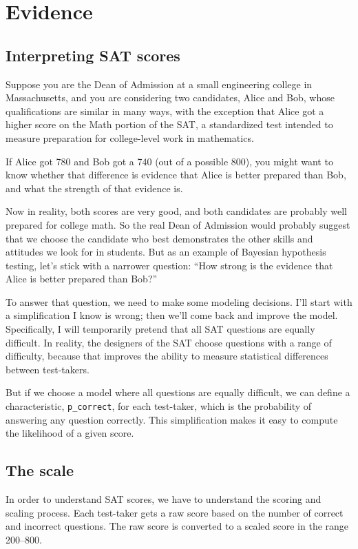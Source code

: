 \documentclass[12pt]{book}
\begin{document}
\chapter{Evidence}
\label{evidence}

\section{Interpreting SAT scores}

Suppose you are the Dean of Admission at a small engineering
college in Massachusetts, and you are considering two candidates,
Alice and Bob, whose qualifications are similar in many ways,
with the exception that Alice got a higher score on the Math
portion of the SAT, a standardized test intended to measure
preparation for college-level work in mathematics.

If Alice got 780 and Bob got a 740 (out of a possible 800), you might
want to know whether that difference is evidence that Alice is better
prepared than Bob, and what the strength of that evidence is.

Now in reality, both scores are very good, and both 
candidates are probably well prepared for college math.  So
the real Dean of Admission would probably suggest that we choose
the candidate who best demonstrates the other skills and
attitudes we look for in students.  But as an example of
Bayesian hypothesis testing, let's stick with a narrower question:
``How strong is the evidence that Alice is better prepared
than Bob?''

To answer that question, we need to make some modeling decisions.
I'll start with a simplification I know is wrong; then we'll come back
and improve the model.  Specifically, I will temporarily pretend that
all SAT questions are equally difficult.  In reality, the designers of
the SAT choose questions with a range of difficulty, because that
improves the ability to measure statistical differences between
test-takers.

But if we choose a model where all questions are equally difficult, we
can define a characteristic, \verb"p_correct", for each test-taker,
which is the probability of answering any question correctly.  This
simplification makes it easy to compute the likelihood of a given
score.


\section{The scale}

In order to understand SAT scores, we have to understand the scoring
and scaling process.  Each test-taker gets a raw score based on the
number of correct and incorrect questions.  The raw score is converted
to a scaled score in the range 200--800.
\end{document}
